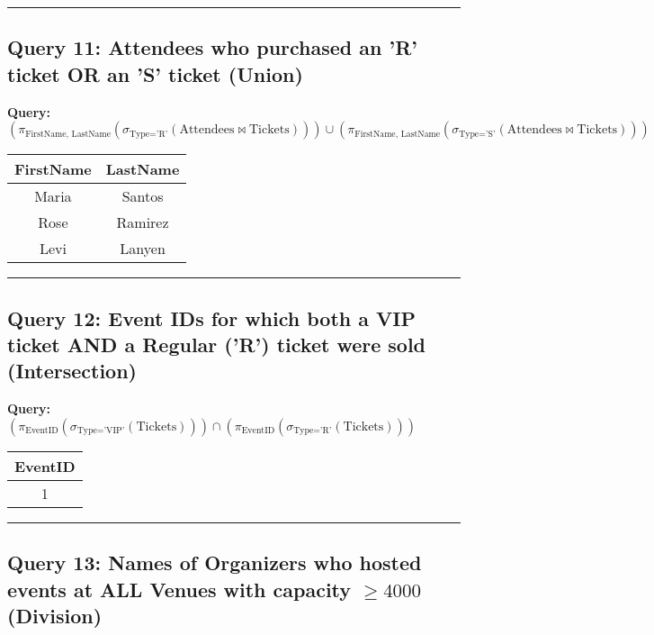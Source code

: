 \documentclass{article}
\begin{document}
\hrule

\subsection*{Query 11: Attendees who purchased an 'R' ticket OR an 'S' ticket (Union)}

\noindent \textbf{Query:} $\left( \pi_{\text{FirstName, LastName}} \left( \sigma_{\text{Type='R'}} \left( \text{Attendees} \bowtie \text{Tickets} \right) \right) \right) \cup \left( \pi_{\text{FirstName, LastName}} \left( \sigma_{\text{Type='S'}} \left( \text{Attendees} \bowtie \text{Tickets} \right) \right) \right)$

\begin{center}
\begin{tabular}{cc}
\toprule
\textbf{FirstName} & \textbf{LastName} \\
\midrule
Maria & Santos \\
Rose & Ramirez \\
Levi & Lanyen \\
\bottomrule
\end{tabular}
\end{center}

\hrule

\subsection*{Query 12: Event IDs for which both a VIP ticket AND a Regular ('R') ticket were sold (Intersection)}

\noindent \textbf{Query:} $\left( \pi_{\text{EventID}} \left( \sigma_{\text{Type='VIP'}} (\text{Tickets}) \right) \right) \cap \left( \pi_{\text{EventID}} \left( \sigma_{\text{Type='R'}} (\text{Tickets}) \right) \right)$

\begin{center}
\begin{tabular}{c}
\toprule
\textbf{EventID} \\
\midrule
1 \\
\bottomrule
\end{tabular}
\end{center}

\hrule

\subsection*{Query 13: Names of Organizers who hosted events at ALL Venues with capacity $\ge 4000$ (Division)}
\end{document}

